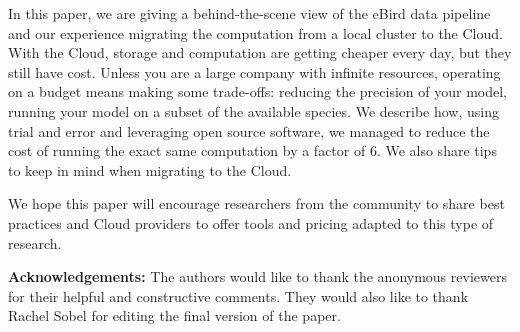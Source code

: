 \documentclass{acm_proc_article-sp}
\begin{document}
In this paper, we are giving a behind-the-scene view of the eBird data pipeline and our experience migrating the computation from a local cluster to the Cloud. With the Cloud, storage and computation are getting cheaper every day, but they still have cost. Unless you are a large company with infinite resources, operating on a budget means making some trade-offs: reducing the precision of your model, running your model on a subset of the available species.
We describe how, using trial and error and leveraging open source software, we managed to reduce the cost of running the exact same computation by a factor of 6. We also share tips to keep in mind when migrating to the Cloud.

We hope this paper will encourage researchers from the community to share best practices and Cloud providers to offer tools and pricing adapted to this type of research.

{\bf Acknowledgements:} The authors would like to thank the anonymous reviewers for their helpful and constructive comments. They would also like to thank Rachel Sobel for editing the final version of the paper.


\vspace{2.5mm}

\end{document}
